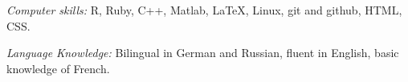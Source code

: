 \documentclass[margin]{res} %
\begin{document}
\begin{resume}
{\sl Computer skills:}
R, Ruby, C++, Matlab, \LaTeX, Linux, git and github, HTML, CSS.

{\sl Language Knowledge:}
Bilingual in German and Russian, fluent in English, basic knowledge of French.

%
%


\end{resume}
\end{document}
